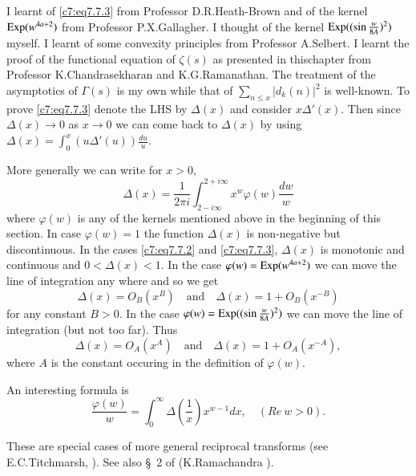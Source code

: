 \begin{remarks*}
I learnt of \eqref{c7:eq7.7.3} from Professor D.R.\@ Heath-Brown
and of the kernel $\operatorname{Exp}(w^{4a+2})$ from Professor P.X.\@ Gallagher. I
thought of the kernel $\operatorname{Exp}((\sin \frac{w}{8A})^{2})$ myself. I learnt
of some convexity principles from Professor A.\@ Selbert. I learnt the
proof of the functional equation of $\zeta(s)$ as presented in
this\pageoriginale chapter from Professor K.\@ Chandrasekharan and
K.G.\@ Ramanathan. The treatment of the asymptotics of $\Gamma(s)$ is
my own while that of $\sum\limits_{n\leq x}|d_{k}(n)|^{2}$ is
well-known. To prove \eqref{c7:eq7.7.3} denote the LHS by
$\Delta(x)$ and consider $x\Delta'(x)$. Then since $\Delta(x)\to 0$ as
$x\to 0$ we can come back to $\Delta(x)$ by using
$\Delta(x)=\int^{x}_{0}(u\Delta'(u))\frac{du}{u}$.

More generally we can write for $x>0$,
\begin{equation*}
\Delta(x)=\frac{1}{2\pi
  i}\int^{2+i\infty}_{2-i\infty}x^{w}\varphi(w)\frac{dw}{w}\tag{7.7.5}\label{c7:eq7.7.5} 
\end{equation*}
where $\varphi(w)$ is any of the kernels mentioned above in the
beginning of this section. In case $\varphi(w)=1$ the function
$\Delta(x)$ is non-negative but discontinuous. In the cases
\eqref{c7:eq7.7.2} and \eqref{c7:eq7.7.3}, $\Delta(x)$ is
monotonic and continuous and $0<\Delta(x)<1$. In the case
$\varphi(w)=\operatorname{Exp}(w^{4a+2})$ we can move the line of integration any
where and so we get
\begin{equation*}
\Delta(x)=O_{B}(x^{B})\quad\text{and}\quad
\Delta(x)=1+O_{B}(x^{-B})\tag{7.7.6}\label{c7:eq7.7.6} 
\end{equation*}
for any constant $B>0$. In the case
$\varphi(w)=\operatorname{Exp}((\sin\frac{w}{8A})^{2})$ we can move the line of
integration (but not too far). Thus
\begin{equation*}
\Delta(x)=O_{A}(x^{A})\quad\text{and}\quad
\Delta(x)=1+O_{A}(x^{-A}),\tag{7.7.7}\label{c7:eq7.7.7} 
\end{equation*}
where $A$ is the constant occuring in the definition of $\varphi(w)$.

An interesting formula is
\begin{equation*}
\frac{\varphi(w)}{w}=\int^{\infty}_{0}\Delta\left(\frac{1}{x}\right)x^{w-1}dx, \quad (Re\ w>0).\tag{7.7.8}\label{c7:eq7.7.8}
\end{equation*}

These are special cases of more general reciprocal transforms (see
E.C.\@ Titchmarsh, \cite{Titchmarsh3}). See also \S\ 2 of (K.\@ Ramachandra
\cite{Ramachandra18}). 
\end{remarks*}

